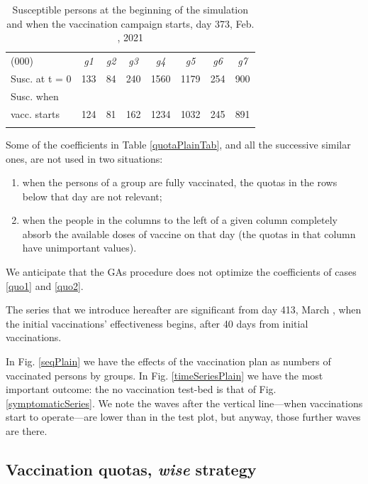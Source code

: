 \documentclass[graybox]{svmult}
\begin{document}
\begin{table}[t]
\centering
\begin{tabular}{lccccccc}
\hline\noalign{\smallskip}
(000) & \emph{g1} & \emph{g2} & \emph{g3} & \emph{g4} & \emph{g5} & \emph{g6} & \emph{g7} \\
\noalign{\smallskip}\svhline\noalign{\smallskip}
Susc. at t = 0 & 133 & 84 & 240 & 1560 & 1179 & 254 & 900 \\
Susc. when\\vacc. starts & 124 & 81 & 162 & 1234 & 1032 & 245 & 891 \\
\hline\noalign{\smallskip} 
\end{tabular}
\caption{Susceptible persons at the beginning of the simulation and when the vaccination campaign starts, day 373, Feb. , 2021}
\label{susceptible}
\end{table}

Some of the coefficients in Table \ref{quotaPlainTab}, and all the successive similar ones, are not used in two situations:

\begin{enumerate}[label=\roman*]
\item \label{quo1} when the persons of a group are fully vaccinated, the quotas in the rows below that day are not relevant;
\item \label{quo2} when the people in the columns to the left of a given column completely absorb the available doses of vaccine on that day (the quotas in that column have unimportant values).
\end{enumerate}

We anticipate that the GAs procedure does not optimize the coefficients of cases \ref{quo1} and \ref{quo2}.

The series that we introduce hereafter are significant from day 413, March , when the initial vaccinations' effectiveness begins, after 40 days from initial vaccinations.

In Fig. \ref{seqPlain} we have the effects of the vaccination plan as numbers of vaccinated persons by groups. In Fig. \ref{timeSeriesPlain} we have the most important outcome: the no vaccination test-bed is that of Fig. \ref{symptomaticSeries}. We note the waves after the vertical line---when vaccinations start to operate---are lower than in the test plot, but anyway, those further waves are there.


\subsection{Vaccination quotas, \emph{wise} strategy}
\label{wise}
\end{document}
